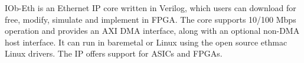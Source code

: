 IOb-Eth is an Ethernet IP core written in Verilog, which
users can download for free, modify, simulate and implement in FPGA.
The core supports 10/100 Mbps operation and provides an AXI DMA interface, along with an optional non-DMA host interface. It can run in baremetal or Linux using the open source ethmac Linux drivers.
The IP offers support for ASICs and FPGAs.
